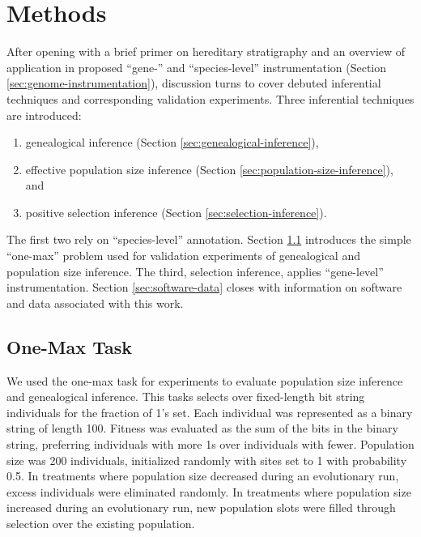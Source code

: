 \section{Methods} \label{sec:methods}

After opening with a brief primer on hereditary stratigraphy and an overview of application in proposed ``gene-'' and ``species-level'' instrumentation (Section \ref{sec:genome-instrumentation}), discussion turns to cover debuted inferential techniques and corresponding validation experiments.
Three inferential techniques are introduced:
\begin{enumerate}
\item genealogical inference (Section \ref{sec:genealogical-inference}),
\item effective population size inference (Section \ref{sec:population-size-inference}), and
\item positive selection inference (Section \ref{sec:selection-inference}).
\end{enumerate}

The first two rely on ``species-level'' annotation.
Section \ref{sec:one-max} introduces the simple ``one-max'' problem used for validation experiments of genealogical and population size inference.
The third, selection inference, applies ``gene-level'' instrumentation.
Section \ref{sec:software-data} closes with information on software and data associated with this work.



\subsection{One-Max Task}
\label{sec:one-max}

We used the one-max task for experiments to evaluate population size inference and genealogical inference.
This tasks selects over fixed-length bit string individuals for the fraction of 1's set.
Each individual was represented as a binary string of length 100.
Fitness was evaluated as the sum of the bits in the binary string, preferring individuals with more 1s over individuals with fewer.
Population size was 200 individuals, initialized randomly with sites set to 1 with probability 0.5.
In treatments where population size decreased during an evolutionary run, excess individuals were eliminated randomly.
In treatments where population size increased during an evolutionary run,
new population slots were filled through selection over the existing population.


